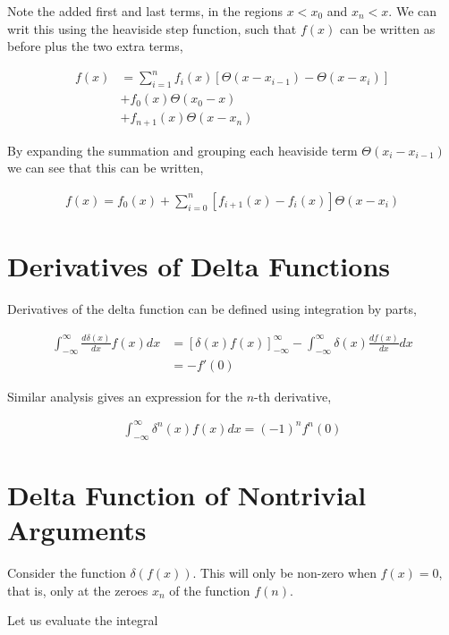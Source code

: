 \documentclass[11pt]{amsart}
\begin{document}
Note the added first and last terms, in the regions $x < x_0$ and $x_n < x$. We can writ this using the heaviside step function, such that $f(x)$ can be written as before plus the two extra terms,

\begin{align*}
  f(x) &= \sum\limits_{i=1}^n f_i(x) \left[\Theta(x - x_{i-1}) - \Theta(x - x_i)\right] \\
       &+ f_0(x) \Theta(x_0 - x) \\
       &+ f_{n+1}(x) \Theta(x - x_n)
\end{align*}

By expanding the summation and grouping each heaviside term $\Theta(x_i - x_{i-1})$ we can see that this can be written,

\begin{align*}
  f(x) = f_0(x) + \sum\limits_{i=0}^n \left[f_{i+1}(x) - f_i(x)\right] \Theta(x - x_i)
\end{align*}

\section{Derivatives of Delta Functions}

Derivatives of the delta function can be defined using integration by parts,

\begin{align*}
  \int_{-\infty}^{\infty} \frac{d\delta(x)}{dx} f(x) dx &= {\left[\delta(x)f(x)\right]}_{-\infty}^{\infty} - \int_{-\infty}^{\infty} \delta(x) \frac{d f(x)}{dx} dx \\
                                                        &= -f'(0)
\end{align*}

Similar analysis gives an expression for the $n$-th derivative,

\begin{align*}
  \int_{-\infty}^{\infty} \delta^n(x) f(x) dx = {(-1)}^n f^n(0)
\end{align*}

\section{Delta Function of Nontrivial Arguments}

Consider the function $\delta\left(f\left(x\right)\right)$. This will only be non-zero when $f(x) = 0$, that is, only at the zeroes $x_n$ of the function $f(n)$.

Let us evaluate the integral
\end{document}
